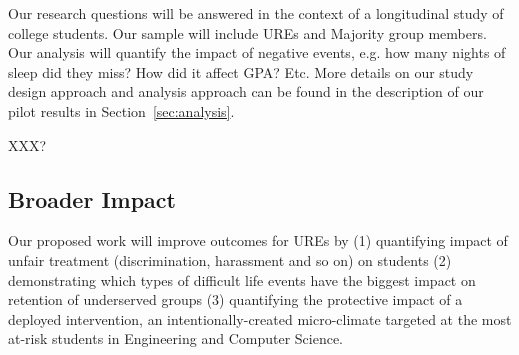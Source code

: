 Our research questions will be answered in the context of a longitudinal study of college students. Our sample will include UREs and Majority group members. %
Our analysis will quantify the impact of negative events, e.g. how many nights of sleep did they miss? How did it affect GPA? Etc. More details on our study design approach and analysis approach can be found in the description of our pilot results in Section~\ref{sec:analysis}. 

 
   \item \label{itm:xxx} XXX?

\subsection{Broader Impact}
\noindent
Our proposed work will improve outcomes for UREs by (1) quantifying impact of unfair treatment (discrimination, harassment and so on)  on students (2) demonstrating which types of difficult life events have the biggest impact on retention of underserved groups (3) quantifying the protective impact of a deployed intervention, an intentionally-created micro-climate targeted at the most at-risk students in Engineering and Computer Science. 
 
